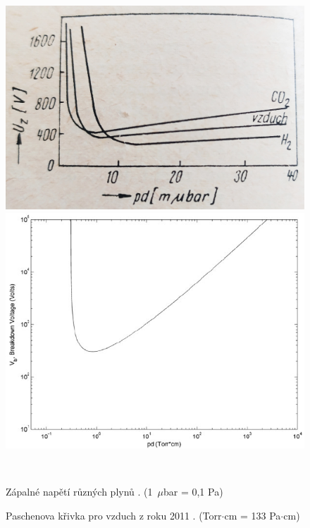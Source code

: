\begin{figure}[h!]
\centering
\begin{minipage}[c]{200pt}
\includegraphics[width=\textwidth]{Figure/02/paschen.png}
\end{minipage}
\begin{minipage}[c]{200pt}
\includegraphics[width=\textwidth]{Figure/02/paschen_air.png}
\end{minipage}
\\
\begin{minipage}[c]{200pt}
\caption{Zápalné napětí různých plynů \cite{kracik}. (1~$\mu$bar = 0,1 Pa)}
\label{obr:paschen}
\end{minipage}
\begin{minipage}[c]{5pt}
\end{minipage}
\begin{minipage}[c]{200pt}
\caption{Paschenova křivka pro vzduch z roku 2011 \cite{Martins2011}. (Torr$\cdot$cm = 133 Pa$\cdot$cm)}
\label{obr:paschen_air}
\end{minipage}
\end{figure}

